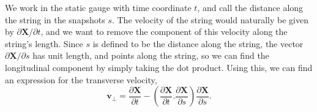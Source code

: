 \documentclass[a4paper,12pt]{article}
\numberwithin{equation}{section}
\begin{document}
We work in the static gauge with time coordinate $t$, and call the distance along the string in the snapshots $s$. The velocity of the string would naturally be given by $\partial\mathbf{X}/\partial t$, and we want to remove the component of this velocity along the string's length. Since $s$ is defined to be the distance along the string, the vector $\partial \mathbf{X} / \partial s$ has unit length, and points along the string, so we can find the longitudinal component by simply taking the dot product. Using this, we can find an expression for the transverse velocity,
\begin{equation}
\mathbf{v}_\perp = \frac{\partial \mathbf{X}}{\partial t} - \left(\frac{\partial \mathbf{X}}{\partial t}.\frac{\partial \mathbf{X}}{\partial s}\right) \frac{\partial \mathbf{X}}{\partial s}.
\end{equation}
\end{document}
